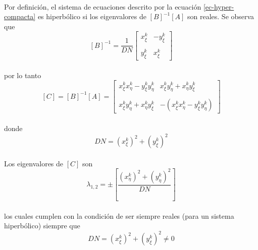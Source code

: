 \documentclass[letterpaper, openright, 12pt]{book}
\begin{document}
    \paragraph*{}
        Por definición, el sistema de ecuaciones descrito por la ecuación
        \ref{ec-hyper-compacta} es hiperbólico si los eigenvalores de
        $\left[ B \right]^{-1} \left[ A \right]$ son reales. Se observa que\\
        \begin{equation*}
            \left[ B \right]^{-1} = \frac{1}{DN}\begin{bmatrix}
            x_{\xi}^{k} & -y_{\xi}^{k} \\ \\
            y_{\xi}^{k} & x_{\xi}^{k}
            \end{bmatrix}
        \end{equation*}\\
        por lo tanto
        \begin{equation*}
            \left[ C \right] = \left[ B \right]^{-1} \left[ A \right] = \begin{bmatrix}
            x_{\xi}^{k} x_{\eta}^{k} - y_{\xi}^{k} y_{\eta}^{k} &
            x_{\xi}^{k} y_{\eta}^{k} + x_{\eta}^{k} y_{\xi}^{k} \\ \\
            x_{\xi}^{k} y_{\eta}^{k} + x_{\eta}^{k} y_{\xi}^{k} &
            - \left( x_{\xi}^{k} x_{\eta}^{k} - y_{\xi}^{k} y_{\eta}^{k} \right)
            \end{bmatrix}
        \end{equation*}\\
        donde
        \begin{equation*}
            DN = \left( x_{\xi}^{k} \right)^2 + \left( y_{\xi}^{k} \right)^2
        \end{equation*}
    \paragraph*{}
        Los eigenvalores de $\left[ C \right]$ son
        \begin{equation*}
            \lambda_{1, 2} = \pm \left[ \frac{\left(x_{\eta}^{k} \right)^2 + \left( y_{\eta}^{k} \right)^2} {DN} \right]
        \end{equation*}\\
        los cuales cumplen con la condición de ser siempre reales (para un
        sistema hiperbólico) siempre que
        \begin{equation*}
            DN = \left( x_{\xi}^{k} \right)^2 + \left( y_{\xi}^{k} \right)^2 \neq 0
        \end{equation*}
\end{document}
